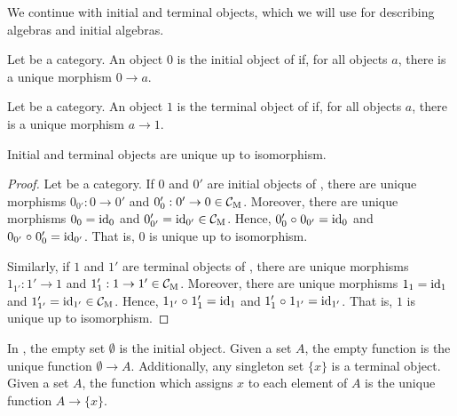 We continue with initial and terminal objects, which we will use for
describing algebras and initial algebras.

\begin{definition}
  \label{def:initial-object}


  Let  be a category. An object $0$ is the initial object of
   if, for all objects $a$, there is a unique morphism $0 \to
  a$.

\end{definition}

\begin{definition}
  \label{def:terminal-object}


  Let  be a category. An object $1$ is the terminal object of
   if, for all objects $a$, there is a unique morphism $a \to
  1$.

\end{definition}

\begin{lemma}

  Initial and terminal objects are unique up to isomorphism.

  \begin{proof}

    Let  be a category. If $0$ and $0'$ are initial objects of
    , there are unique morphisms $0_{0'}: 0 \to 0'$ and
    $0'_{0}: 0' \to 0 \in \mathcal{C}_{\operatorname{M}}$. Moreover, there are unique
    morphisms $0_{0} = \operatorname{id}_{0}$ and $0'_{0'} = \operatorname{id}_{0'} \in \mathcal{C}_{\operatorname{M}}$.
    Hence, $0'_{0} \mathrel{\circ} 0_{0'} = \operatorname{id}_{0}$ and $0_{0'} \mathrel{\circ} 0'_{0} =
    \operatorname{id}_{0'}$. That is, $0$ is unique up to isomorphism.

    Similarly, if $1$ and $1'$ are terminal objects of , there
    are unique morphisms $1_{1'}: 1' \to 1$ and $1'_{1}: 1 \to 1' \in
    \mathcal{C}_{\operatorname{M}}$. Moreover, there are unique morphisms $1_{1} = \operatorname{id}_{1}$
    and $1'_{1'} = \operatorname{id}_{1'} \in \mathcal{C}_{\operatorname{M}}$. Hence, $1_{1'} \mathrel{\circ} 1'_{1}
    = \operatorname{id}_{1}$ and $1'_{1} \mathrel{\circ} 1_{1'} = \operatorname{id}_{1'}$. That is, $1$ is
    unique up to isomorphism.

  \end{proof}

\end{lemma}

\begin{example}
  \label{ex:initial-terminal-objects-set}


  In \set, the empty set $\emptyset$ is the initial object. Given a
  set $A$, the empty function is the unique function $\emptyset \to
  A$. Additionally, any singleton set $\{x\}$ is a terminal object.
  Given a set $A$, the function which assigns $x$ to each element of
  $A$ is the unique function $A \to \{x\}$.

\end{example}

